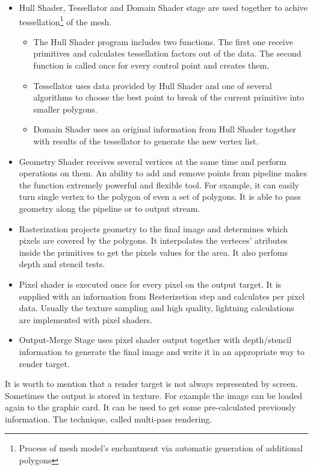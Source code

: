 \documentclass[twoside, english, 11pt]{report}
\begin{document}
\begin{itemize}
\item Hull Shader, Tessellator and Domain Shader stage are used together to achive tessellation\footnote{Process of mesh model's enchantment via automatic generation of additional polygons} of the mesh.
  \begin{itemize}
    \item The Hull Shader program includes two functions. The first one receive primitives and calculates tessellation factors out of the data. The second function is called once for every control point and creates them.
    \item Tessellator uses data provided by Hull Shader and one of several algorithms to choose the best point to break of the current primitive into smaller polygons.
    \item Domain Shader uses an original information from Hull Shader together with results of the tessellator to generate the new vertex list.
  \end{itemize}
\item Geometry Shader receives several vertices at the same time and perform operations on them. An ability to add and remove points from pipeline makes the function extremely powerful and flexible tool. For example, it can easily turn single vertex to the polygon of even a set of polygons. It is able to pass geometry along the pipeline or to output stream.
\item Rasterization projects geometry to the final image and determines which pixels are covered by the polygons. It interpolates the verteces' atributes inside the primitives to get the pixels values for the area. It also perfoms depth and stencil tests.
\item Pixel shader is executed once for every pixel on the output target. It is supplied with an information from Resterizetion step and calculates per pixel data. Usually the texture sampling and high quality, lightning calculations are implemented with pixel shaders.
\item Output-Merge Stage uses pixel shader output together with depth/stencil information to generate the final image and write it in an appropriate way to render target.
\end{itemize}

It is worth to mention that a render target is not always represented by screen. Sometimes the output is stored in texture. For example the image can be loaded again to the graphic card. It can be used to get some pre-calculated previously information. The technique, called multi-pass rendering.
\end{document}
